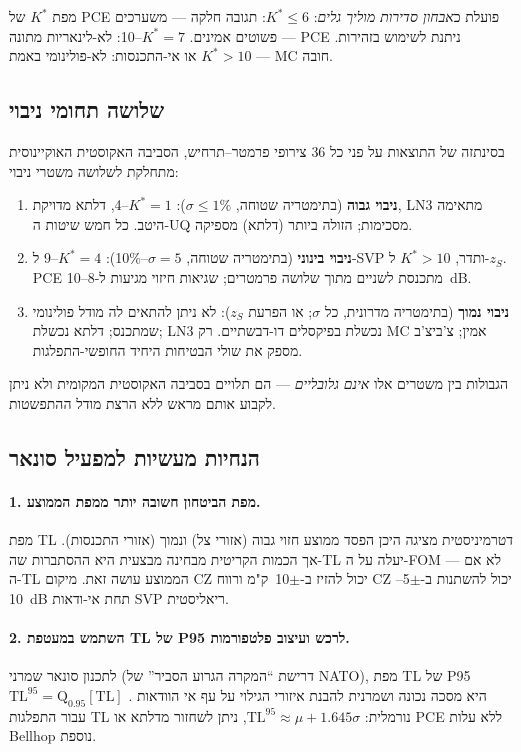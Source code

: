 \documentclass[12pt,a4paper]{article}
\begin{document}
מפת $K^*$ של \textenglish{PCE} פועלת כ\emph{אבחון סדירות מוליך גלים}:
$K^*\leq 6$: תגובה חלקה --- משערכים פשוטים אמינים.
$K^*=7$--10: לא-לינאריות מתונה --- \textenglish{PCE} ניתנת לשימוש בזהירות.
$K^*>10$ או אי-התכנסות: לא-פולינומי באמת --- MC חובה.

\subsection{שלושה תחומי ניבוי}
\label{sec:three_regimes}

בסינתזה של התוצאות על פני כל 36 צירופי פרמטר--תרחיש, הסביבה האקוסטית האוקיינוסית
מתחלקת לשלושה משטרי ניבוי:

\begin{enumerate}
  \item \textbf{ניבוי גבוה} (בתימטריה שטוחה, $\sigma\leq 1\%$):
        $K^*=1$--4, דלתא מדויקת, LN3 מתאימה היטב.
        כל חמש שיטות ה-UQ מסכימות; הזולה ביותר (דלתא) מספיקה.
  \item \textbf{ניבוי בינוני} (בתימטריה שטוחה, $\sigma=5$--10\%{}):
        $K^*=4$--9 ל-SVP ותדר, $K^*>10$ ל-$z_S$.
        PCE מתכנסת לשניים מתוך שלושה פרמטרים; שגיאות חיזוי מגיעות ל-8--10~dB.
  \item \textbf{ניבוי נמוך} (בתימטריה מדרונית, כל $\sigma$; או הפרעת $z_S$):
        לא ניתן להתאים לה מודל פולינומי שמתכנס; דלתא נכשלת; LN3 נכשלת בפיקסלים דו-דבשתיים.
        רק MC אמין; צ'ביצ'ב מספק את שולי הבטיחות היחיד החופשי-התפלגות.
\end{enumerate}

הגבולות בין משטרים אלו \emph{אינם גלובליים} --- הם תלויים בסביבה האקוסטית המקומית
ולא ניתן לקבוע אותם מראש ללא הרצת מודל ההתפשטות.

\subsection{הנחיות מעשיות למפעיל סונאר}
\label{sec:operator_guidance}

\paragraph{1. מפת הביטחון חשובה יותר ממפת הממוצע.}
מפת TL דטרמיניסטית מציגה היכן הפסד ממוצע חזוי גבוה (אזורי צל)
ונמוך (אזורי התכנסות).
אך הכמות הקריטית מבחינה מבצעית היא ההסתברות שה-TL יעלה על ה-FOM ---
לא אם ה-TL הממוצע עושה זאת.
מיקום CZ יכול להזיז ב-$\pm$10~ק"מ ורווח CZ יכול להשתנות ב-$\pm$5--10~dB
תחת אי-ודאות SVP ריאליסטית.

\paragraph{2. השתמש במעטפת TL של P95 לרכש ועיצוב פלטפורמות.}
לתכנון סונאר שמרני (דרישת ``המקרה הגרוע הסביר'' של \textenglish{NATO}),
מפת TL של P95 $\mathrm{TL}^{95}=\mathrm{Q}_{0.95}[\mathrm{TL}]$ היא
מסכה נכונה ושמרנית להבנת איזורי הגילוי על עף אי הוודאות .
עבור התפלגות TL נורמלית: $\mathrm{TL}^{95}\approx\mu+1.645\sigma$, ניתן לשחזור
מדלתא או \textenglish{PCE} ללא עלות \textenglish{Bellhop} נוספת.
\end{document}
